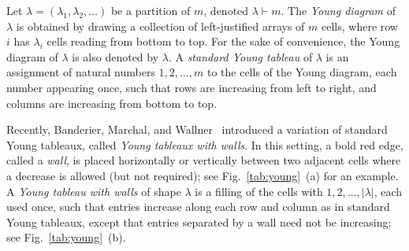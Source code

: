 \documentclass[reqno, 12pt]{article}
\theoremstyle{mydefinition}
\theoremstyle{myremark}
\numberwithin{algorithm}{section}
\begin{document}
Let $\lambda=(\lambda_1,\lambda_2,\ldots)$ be a partition of $m$, denoted $\lambda \vdash m$.
The \emph{Young diagram} of $\lambda$ is obtained by drawing a collection of left-justified arrays of $m$ cells, where row $i$ has $\lambda_i$ cells reading from bottom to top.
For the sake of convenience, the Young diagram of $\lambda$ is also denoted by $\lambda$.
A \emph{standard Young tableau} of $\lambda$ is an assignment of natural numbers $1,2,\ldots,m$ to the cells of the Young diagram, each number appearing once, such that rows are increasing from left to right, and columns are increasing from bottom to top.


Recently, Banderier, Marchal, and Wallner~\cite{C.Banderier18,C.Banderier21} introduced a variation of standard Young tableaux, called \emph{Young tableaux with walls}. In this setting, a bold red edge, called a \emph{wall}, is placed horizontally or vertically between two adjacent cells where a decrease is allowed (but not required); see Fig.~\ref{tab:young}~(a) for an example. A \emph{Young tableau with walls} of shape $\lambda$ is a filling of the cells with $1,2,\dots,|\lambda|$, each used once, such that entries increase along each row and column as in standard Young tableaux, except that entries separated by a wall need not be increasing; see Fig.~\ref{tab:young}~(b).
\end{document}
